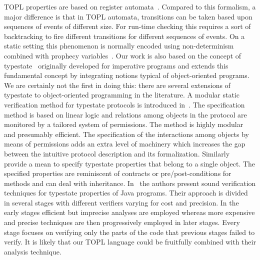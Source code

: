 \documentclass{sigplanconf}[10pt] %
\begin{document}
TOPL properties are based on register automata~\cite{dblp:journals/tocl/demril09}.
Compared to this formalism, a major difference is that in TOPL automata, transitions can be taken based upon sequences of events of different size.
For run-time checking this requires a sort of backtracking to fire different transitions for different  sequences of events.
On a static setting this phenomenon is normally encoded using non-determinism combined with prophecy variables~\cite{dblp:journals/tcs/abadil91}.
Our work is also based on the concept of typestate~\cite{strom1986} originally developed for imperative programs and extends this fundamental concept by integrating notions typical of object-oriented programs.
We are certainly not the first in doing this: there are several extensions of typestate to object-oriented programming in the literature.
A modular static verification method for typestate protocols is introduced in~\cite{dblp:conf/oopsla/bierhoffa07}.
The specification method is based on linear logic and relations among objects in the protocol are monitored by a tailored system of permissions.
The method is highly modular and presumably efficient.
The specification of the interactions among objects by means of permissions adds an extra level of machinery which increases the gap between the intuitive protocol description and its formalization.
Similarly~\cite{deline2004,dblp:conf/sigsoft/BierhoffA05} provide a mean to specify typestate properties that belong to a single object.
The specified properties are reminiscent of contracts or pre/post-conditions for methods and can deal with inheritance.
In~\cite{dblp:conf/issta/FinkYDRG06} the authors present sound verification techniques for typestate properties of Java  programs.
Their approach is divided in several stages with different verifiers varying for cost and precision.
In the early stages efficient but imprecise analyses are employed whereas more expensive and precise techniques are then progressively employed in later stages.
Every stage focuses on verifying only the parts of the code that previous stages failed to verify.
It is likely that our TOPL language could be fruitfully combined with their analysis technique.
\end{document}
